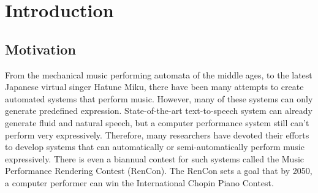 \chapter{Introduction}
\section{Motivation}
From the mechanical music performing automata of the middle ages, to the latest Japanese virtual singer Hatune Miku, there have been many attempts to create automated systems that perform music. However, many of these systems can only generate predefined expression. State-of-the-art text-to-speech system can already generate fluid and natural speech, but a computer performance system still can't perform very expressively. Therefore, many researchers have devoted their efforts to develop systems that can automatically or semi-automatically perform music expressively. There is even a biannual contest for such systems called the Music Performance Rendering Contest (RenCon)\cite{RenCon}. The RenCon sets a goal that by 2050, a computer performer can win the International Chopin Piano Contest.


